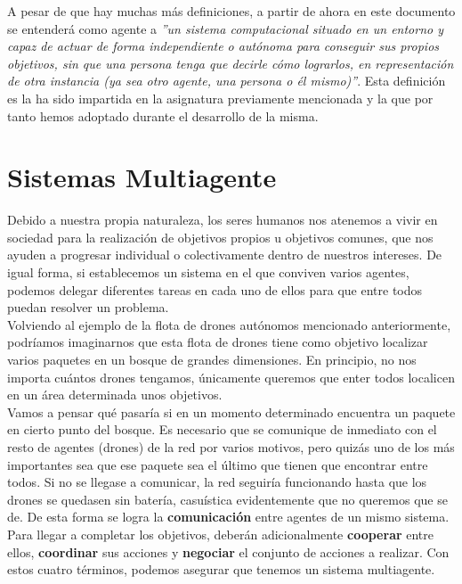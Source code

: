A pesar de que hay muchas más definiciones, a partir de ahora en este documento se entenderá como agente a \textit{''un sistema computacional situado en un entorno y capaz de actuar de forma independiente o autónoma para conseguir sus propios objetivos, sin que una persona tenga que decirle cómo lograrlos, en representación de otra instancia (ya sea otro agente, una persona o él mismo)''}. Esta definición es la ha sido impartida en la asignatura previamente mencionada y la que por tanto hemos adoptado durante el desarrollo de la misma.

\section{Sistemas Multiagente}

Debido a nuestra propia naturaleza, los seres humanos nos atenemos a vivir en sociedad para la realización de objetivos propios u objetivos comunes, que nos ayuden a progresar individual o colectivamente dentro de nuestros intereses. De igual forma, si establecemos un sistema en el que conviven varios agentes, podemos delegar diferentes tareas en cada uno de ellos para que entre todos puedan resolver un problema.\\

Volviendo al ejemplo de la flota de drones autónomos mencionado anteriormente, podríamos imaginarnos que esta flota de drones tiene como objetivo localizar varios paquetes en un bosque de grandes dimensiones. En principio, no nos importa cuántos drones tengamos, únicamente queremos que enter todos localicen en un área determinada unos objetivos.\\

Vamos a pensar qué pasaría si en un momento determinado encuentra un paquete en cierto punto del bosque. Es necesario que se comunique de inmediato con el resto de agentes (drones) de la red por varios motivos, pero quizás uno de los más importantes sea que ese paquete sea el último que tienen que encontrar entre todos. Si no se llegase a comunicar, la red seguiría funcionando hasta que los drones se quedasen sin batería, casuística evidentemente que no queremos que se de. De esta forma se logra la \textbf{comunicación} entre agentes de un mismo sistema.\\

Para llegar a completar los objetivos, deberán adicionalmente \textbf{cooperar} entre ellos, \textbf{coordinar} sus acciones y \textbf{negociar} el conjunto de acciones a realizar. Con estos cuatro términos, podemos asegurar que tenemos un sistema multiagente.

